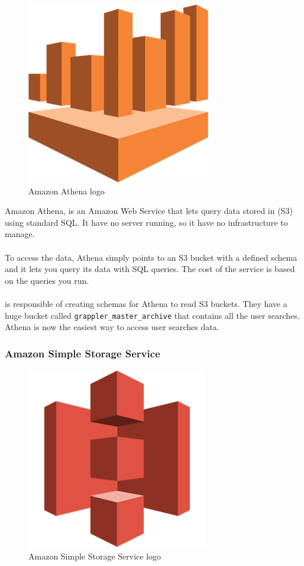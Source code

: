 \begin{figure}[H]
\centering
\includegraphics[scale=0.1]{resources/athena-logo.png}
\caption{Amazon Athena logo}
\end{figure}

Amazon Athena\cite{athena}, is an Amazon Web Service that lets query data stored in  (S3) using standard SQL\cite{sql}. It have no server running, so it have no infrastructure to manage.
\\\\
To access the data, Athena simply points to an S3 bucket with a defined schema and it lets you query its data with SQL queries. The cost of the service is based on the queries you run.
\\\\
 is responsible of creating schemas for Athena to read S3 buckets. They have a huge bucket called \texttt{grappler\_master\_archive} that contains all the user searches. Athena is now the easiest way to access user searches data.

\subsubsection*{Amazon Simple Storage Service} \label{s3}

\begin{figure}[H]
\centering
\includegraphics[scale=0.1]{resources/s3-logo.png}
\caption{Amazon Simple Storage Service logo}
\end{figure}

